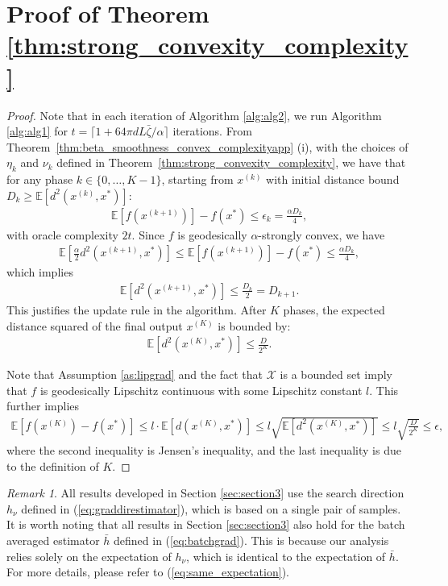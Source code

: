 \documentclass{article}
\newcommand{\pert}{\nu}
\theoremstyle{plain}
\theoremstyle{definition}
\theoremstyle{remark}
\newtheorem{remark}[theorem]{Remark}
\begin{document}
\section{Proof of Theorem \ref{thm:strong_convexity_complexity}}\label{pf:strong_convexity_complexity}

\begin{proof}
Note that in each iteration of Algorithm \ref{alg:alg2}, we run Algorithm \ref{alg:alg1} for $t = \lceil{1+64\pi d L\bar{\zeta}/\alpha}\rceil$ iterations. 
From Theorem~\ref{thm:beta_smoothness_convex_complexityapp} (i), with the choices of $\eta_k$ and $\nu_k$ defined in Theorem~\ref{thm:strong_convexity_complexity}, we have that for any phase $k \in \{0, \dots, K-1\}$, starting from $x^{(k)}$ with initial distance bound $D_{k} \geq\mathbb{E}[d^2(x^{(k)}, x^*)]$:
\begin{align*}
\mathbb{E}[f({x}^{(k+1)})] - f(x^*) \leq \epsilon_k = \frac{\alpha D_{k}}{4},
\end{align*}
with oracle complexity $ 2t $. Since $f$ is geodesically $\alpha$-strongly convex, we have
\begin{align*}
\mathbb{E}\left[\frac{\alpha}{2} d^2({x}^{(k+1)}, x^*)\right] \leq \mathbb{E}[f(x^{(k+1)})] - f(x^*) \leq \frac{\alpha D_{k}}{4},
\end{align*}
which implies 
\begin{align*}
\mathbb{E}[d^2({x}^{(k+1)}, x^*)] \leq \frac{D_{k}}{2} = D_{k+1}.
\end{align*}
This justifies the update rule in the algorithm. 
After $K$ phases, the expected distance squared of the final output $x^{(K)}$ is bounded by:
\begin{align*}
    \mathbb{E}[d^2(x^{(K)}, x^*)] \leq \frac{D}{2^K}.
\end{align*}

Note that Assumption \ref{as:lipgrad} and the fact that $\mathcal{X}$ is a bounded set imply that $f$ is geodesically Lipschitz continuous with some Lipschitz constant $l$. This further implies
\begin{align*}
    \mathbb{E}[f(x^{(K)}) - f(x^*)] 
    \leq l \cdot \mathbb{E}[d(x^{(K)} , x^*)] \leq l \sqrt{\mathbb{E}[d^2(x^{(K)} , x^*)]} \leq l \sqrt{\frac{D}{2^K}} \leq \epsilon,
\end{align*}
where the second inequality is Jensen's inequality, and the last inequality is due to the definition of $K$.
\end{proof}

\begin{remark}
All results developed in Section \ref{sec:section3} use the search direction $h_{\pert}$ defined in (\ref{eq:graddirestimator}), which is based on a single pair of samples. It is worth noting that all results in Section \ref{sec:section3} also hold for the batch averaged estimator $\bar{h}$ defined in (\ref{eq:batchgrad}). This is because our analysis relies solely on the expectation of $h_{\pert}$, which is identical to the expectation of $\bar{h}$. For more details, please refer to (\ref{eq:same_expectation}).
\end{remark}
\end{document}
